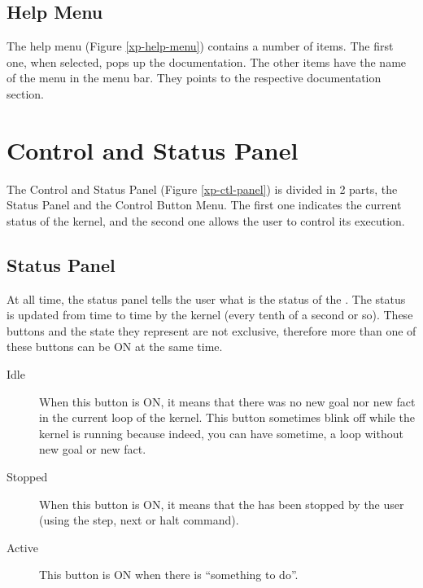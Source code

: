 \subsection{\XOPRS{} Help Menu}


The help menu (Figure \ref{xp-help-menu}) contains a number of items. The
first one, when selected, pops up the documentation. The other items have
the name of the menu in the menu bar. They points to the respective
documentation section.

\section{Control and Status Panel}


The Control and Status Panel (Figure \ref{xp-ctl-panel}) is divided in 2 parts,
the Status Panel and the Control Button Menu. The first one indicates the
current status of the kernel, and the second one allows the user to control its
execution.



\subsection{Status Panel}

At all time, the status panel tells the user what is the status of the
\XPK{}. The status is updated from time to time by the \XOPRS{}
kernel (every tenth of a second or so). These buttons and the state they
represent are not exclusive, therefore more than one of these buttons can
be ON at the same time.

\begin{description}

\item[Idle] When this button is ON, it means that there was no new goal
nor new fact in the current loop of the kernel. This button sometimes
blink off while the kernel is running because indeed, you can have
sometime, a loop without new goal or new fact.

\item[Stopped] When this button is ON, it means that the \XPK{}
has been stopped by the user (using the step, next or halt command).

\item[Active] This button is ON when there is ``something to do''.

\end{description}

